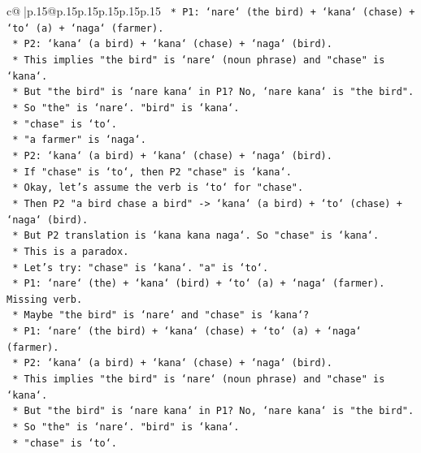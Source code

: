 \documentclass{article}
\begin{document}
{\begin{supertabular}{c@{$\;$}|p{.15\linewidth}@{}p{.15\linewidth}p{.15\linewidth}p{.15\linewidth}p{.15\linewidth}p{.15\linewidth}}
{{{\texttt{            *   P1: `nare` (the bird) + `kana` (chase) + `to` (a) + `naga` (farmer).} \\
\texttt{            *   P2: `kana` (a bird) + `kana` (chase) + `naga` (bird).} \\
\texttt{            *   This implies "the bird" is `nare` (noun phrase) and "chase" is `kana`.} \\
\texttt{            *   But "the bird" is `nare kana` in P1? No, `nare kana` is "the bird".} \\
\texttt{            *   So "the" is `nare`. "bird" is `kana`.} \\
\texttt{            *   "chase" is `to`.} \\
\texttt{            *   "a farmer" is `naga`.} \\
\texttt{            *   P2: `kana` (a bird) + `kana` (chase) + `naga` (bird).} \\
\texttt{            *   If "chase" is `to`, then P2 "chase" is `kana`.} \\
\texttt{            *   Okay, let's assume the verb is `to` for "chase".} \\
\texttt{            *   Then P2 "a bird chase a bird" {-}> `kana` (a bird) + `to` (chase) + `naga` (bird).} \\
\texttt{            *   But P2 translation is `kana kana naga`. So "chase" is `kana`.} \\
\texttt{            *   This is a paradox.} \\
\texttt{            *   Let's try: "chase" is `kana`. "a" is `to`.} \\
\texttt{            *   P1: `nare` (the) + `kana` (bird) + `to` (a) + `naga` (farmer). Missing verb.} \\
\texttt{            *   Maybe "the bird" is `nare` and "chase" is `kana`?} \\
\texttt{            *   P1: `nare` (the bird) + `kana` (chase) + `to` (a) + `naga` (farmer).} \\
\texttt{            *   P2: `kana` (a bird) + `kana` (chase) + `naga` (bird).} \\
\texttt{            *   This implies "the bird" is `nare` (noun phrase) and "chase" is `kana`.} \\
\texttt{            *   But "the bird" is `nare kana` in P1? No, `nare kana` is "the bird".} \\
\texttt{            *   So "the" is `nare`. "bird" is `kana`.} \\
\texttt{            *   "chase" is `to`.} \\
}}}
\end{supertabular}}
\end{document}
